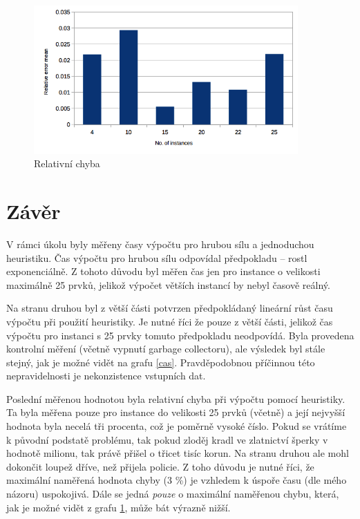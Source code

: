 \documentclass[a4paper]{article}
\begin{document}
	\begin{figure}[ht]
		\includegraphics[width=0.9\textwidth]{relativni_chyba.png} \caption{Relativní chyba} \label{chyba}
	\end{figure}

\section{Závěr}
	V rámci úkolu byly měřeny časy výpočtu pro hrubou sílu a jednoduchou heuristiku. Čas výpočtu pro hrubou sílu odpovídal předpokladu -- rostl exponenciálně. Z tohoto důvodu byl měřen čas jen pro instance o velikosti maximálně 25 prvků, jelikož výpočet větších instancí by nebyl časově reálný.
	
	Na stranu druhou byl z větší části potvrzen předpokládaný lineární růst času výpočtu při použití heuristiky. Je nutné říci že pouze z větší části, jelikož čas výpočtu pro instanci s 25 prvky tomuto předpokladu neodpovídá. Byla provedena kontrolní měření (včetně vypnutí garbage collectoru), ale výsledek byl stále stejný, jak je možné vidět na grafu \ref{cas}. Pravděpodobnou příčinnou této nepravidelnosti je nekonzistence vstupních dat. 
	
	Poslední měřenou hodnotou byla relativní chyba při výpočtu pomocí heuristiky. Ta byla měřena pouze pro instance do velikosti 25 prvků (včetně) a její nejvyšší hodnota byla necelá tři procenta, což je poměrně vysoké číslo. Pokud se vrátíme k původní podstatě problému, tak pokud zloděj kradl ve zlatnictví šperky v hodnotě milionu, tak právě přišel o třicet tisíc korun. Na stranu druhou ale mohl dokončit loupež dříve, než přijela policie. Z toho důvodu je nutné říci, že maximální naměřená hodnota chyby (3 \%) je vzhledem k úspoře času (dle mého názoru) uspokojivá. Dále se jedná \textit{pouze} o maximální naměřenou chybu, která, jak je možné vidět z grafu \ref{chyba}, může bát výrazně nižší.
\end{document}
